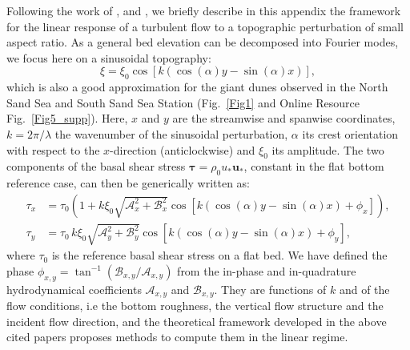 Following the work of \citet{Fourriere2010}, \citet{Andreotti2012} and \citet{Andreotti2009}, we briefly describe in this appendix the framework for the linear response of a turbulent flow to a topographic perturbation of small aspect ratio. As a general bed elevation can be decomposed into Fourier modes, we focus here on a sinusoidal topography:
%
\begin{equation}
\xi = \xi_{0}\cos\left[k\left(\cos(\alpha)y - \sin(\alpha)x\right)\right],
\end{equation}
%
which is also a good approximation for the giant dunes observed in the North Sand Sea and South Sand Sea Station (Fig.~\ref{Fig1} and Online Resource Fig.~\ref{Fig5_supp}). Here, $x$ and $y$ are the streamwise and spanwise coordinates, $k=2\pi/\lambda$ the wavenumber of the sinusoidal perturbation, $\alpha$ its crest orientation with respect to the $x$-direction (anticlockwise) and $\xi_{0}$ its amplitude. The two components of the basal shear stress $\boldsymbol{\tau} = \rho_{0} u_{*}\boldsymbol{u}_{*}$, constant in the flat bottom reference case, can then be generically written as:
%
\begin{align}
\tau_{x} & = \tau_{0}\left(1 + k\xi_{0}\sqrt{\mathcal{A}_{x}^{2} + \mathcal{B}_{x}^{2}}\cos\left[k\left(\cos(\alpha)y - \sin(\alpha)x\right) + \phi_{x}\right]\right), \\
\tau_{y} & = \tau_{0} \, k\xi_{0}\sqrt{\mathcal{A}_{y}^{2} + \mathcal{B}_{y}^{2}}\cos\left[k\left(\cos(\alpha)y - \sin(\alpha)x\right) + \phi_{y}\right],
\end{align}
%
where $\tau_{0}$ is the reference basal shear stress on a flat bed. We have defined the phase $\phi_{x, y} = \tan^{-1}\left(\mathcal{B}_{x, y}/\mathcal{A}_{x, y}\right)$ from the in-phase and in-quadrature hydrodynamical coefficients $\mathcal{A}_{x, y}$ and $\mathcal{B}_{x, y}$. They are functions of $k$ and of the flow conditions, i.e the bottom roughness, the vertical flow structure and the incident flow direction, and the theoretical framework developed in the above cited papers proposes methods to compute them in the linear regime.

